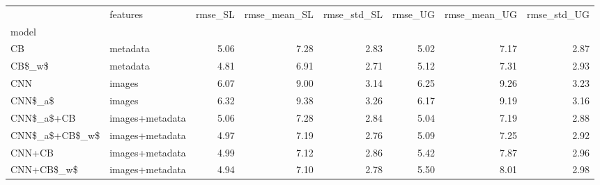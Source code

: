 \begin{tabular}{llrrrrrr}
\toprule
{} &         features &  rmse\_SL &  rmse\_mean\_SL &  rmse\_std\_SL &  rmse\_UG &  rmse\_mean\_UG &  rmse\_std\_UG \\
model          &                  &          &               &              &          &               &              \\
\midrule
CB             &         metadata &     5.06 &          7.28 &         2.83 &     5.02 &          7.17 &         2.87 \\
CB\$\_w\$         &         metadata &     4.81 &          6.91 &         2.71 &     5.12 &          7.31 &         2.93 \\
CNN            &           images &     6.07 &          9.00 &         3.14 &     6.25 &          9.26 &         3.23 \\
CNN\$\_a\$        &           images &     6.32 &          9.38 &         3.26 &     6.17 &          9.19 &         3.16 \\
CNN\$\_a\$+CB     &  images+metadata &     5.06 &          7.28 &         2.84 &     5.04 &          7.19 &         2.88 \\
CNN\$\_a\$+CB\$\_w\$ &  images+metadata &     4.97 &          7.19 &         2.76 &     5.09 &          7.25 &         2.92 \\
CNN+CB         &  images+metadata &     4.99 &          7.12 &         2.86 &     5.42 &          7.87 &         2.96 \\
CNN+CB\$\_w\$     &  images+metadata &     4.94 &          7.10 &         2.78 &     5.50 &          8.01 &         2.98 \\
\bottomrule
\end{tabular}
